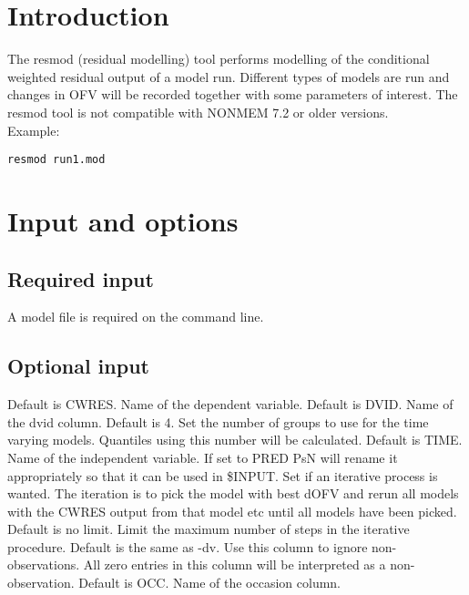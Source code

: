 
\usepackage{hyperref}


\maketitle
\newcommand{\guidetoolname}{resmod}
\tableofcontents
\newpage

\section{Introduction}
The resmod (residual modelling) tool performs modelling of the conditional weighted residual output\cite{Ibrahim} of a model run. Different types of models are run and changes in OFV will be recorded together with some parameters of interest. The resmod tool is not compatible with NONMEM 7.2 or older versions.\\
Example:
\begin{verbatim}
resmod run1.mod
\end{verbatim}

\section{Input and options}

\subsection{Required input}
A model file is required on the command line.

\subsection{Optional input}

\begin{optionlist}
Default is CWRES. Name of the dependent variable. 
\nextopt
{}
Default is DVID. Name of the dvid column. 
\nextopt
{}
Default is 4. Set the number of groups to use for the time varying models. Quantiles using this number will be calculated.
\nextopt
{}
Default is TIME. Name of the independent variable. If set to PRED PsN will rename it appropriately so that it can be used in \$INPUT.
\nextopt
{}
Set if an iterative process is wanted. The iteration is to pick the model with best dOFV and rerun all models with the CWRES output from that model etc until all models have been picked.
\nextopt
{}
Default is no limit. Limit the maximum number of steps in the iterative procedure. 
\nextopt
{}
Default is the same as -dv. Use this column to ignore non-observations. All zero entries in this column will be interpreted as a non-observation.
\nextopt
{}
Default is OCC. Name of the occasion column. 
\nextopt
\end{optionlist}


